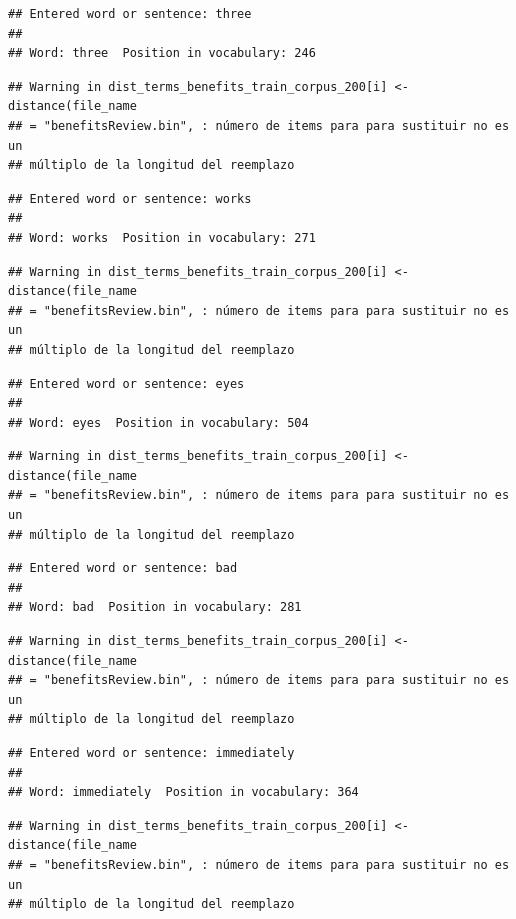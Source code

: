 \documentclass[spanish,]{article}
\begin{document}
\begin{verbatim}
## Entered word or sentence: three
## 
## Word: three  Position in vocabulary: 246
\end{verbatim}

\begin{verbatim}
## Warning in dist_terms_benefits_train_corpus_200[i] <- distance(file_name
## = "benefitsReview.bin", : número de items para para sustituir no es un
## múltiplo de la longitud del reemplazo
\end{verbatim}

\begin{verbatim}
## Entered word or sentence: works
## 
## Word: works  Position in vocabulary: 271
\end{verbatim}

\begin{verbatim}
## Warning in dist_terms_benefits_train_corpus_200[i] <- distance(file_name
## = "benefitsReview.bin", : número de items para para sustituir no es un
## múltiplo de la longitud del reemplazo
\end{verbatim}

\begin{verbatim}
## Entered word or sentence: eyes
## 
## Word: eyes  Position in vocabulary: 504
\end{verbatim}

\begin{verbatim}
## Warning in dist_terms_benefits_train_corpus_200[i] <- distance(file_name
## = "benefitsReview.bin", : número de items para para sustituir no es un
## múltiplo de la longitud del reemplazo
\end{verbatim}

\begin{verbatim}
## Entered word or sentence: bad
## 
## Word: bad  Position in vocabulary: 281
\end{verbatim}

\begin{verbatim}
## Warning in dist_terms_benefits_train_corpus_200[i] <- distance(file_name
## = "benefitsReview.bin", : número de items para para sustituir no es un
## múltiplo de la longitud del reemplazo
\end{verbatim}

\begin{verbatim}
## Entered word or sentence: immediately
## 
## Word: immediately  Position in vocabulary: 364
\end{verbatim}

\begin{verbatim}
## Warning in dist_terms_benefits_train_corpus_200[i] <- distance(file_name
## = "benefitsReview.bin", : número de items para para sustituir no es un
## múltiplo de la longitud del reemplazo
\end{verbatim}
\end{document}
